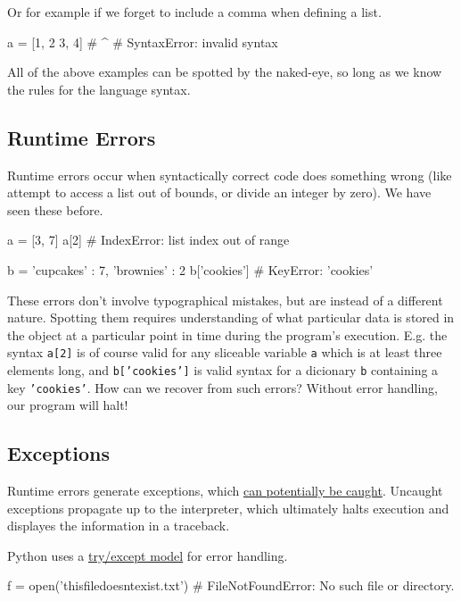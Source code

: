 \documentclass[12pt,letterpaper,twoside]{article}
\begin{document}
\begin{enumerate}
Or for example if we forget to include a comma when defining a list.
\begin{python}
a = [1, 2 3, 4]
#        ^
# SyntaxError: invalid syntax
\end{python}

All of the above examples can be spotted by the naked-eye, so long as we know the rules for the language syntax.

\subsection{Runtime Errors}

Runtime errors occur when syntactically correct code does something
wrong (like attempt to access a list out of bounds, or divide an integer by zero).
We have seen these before.

\begin{python}
a = [3, 7]
a[2]          # IndexError: list index out of range

b = {'cupcakes' : 7, 'brownies' : 2}
b['cookies']  # KeyError: 'cookies'
\end{python}

These errors don't involve typographical mistakes, but are instead of a different nature.
Spotting them requires understanding of what particular data is stored in the object
at a particular point in time during the program's execution. E.g. 
the syntax \texttt{a[2]} is of course valid for any sliceable variable \texttt{a} which is at least three elements long,
and \texttt{b['cookies']} is valid syntax for a dicionary \texttt{b} containing a key \texttt{'cookies'}.
How can we recover from such errors? Without error handling, our program will halt!

\subsection{Exceptions}
Runtime errors generate exceptions, which \href{https://en.wikipedia.org/wiki/Exception_handling}{can potentially be caught}. 
Uncaught exceptions propagate up to the interpreter, which
ultimately halts execution and displayes the information in a traceback.

Python uses a \href{https://docs.python.org/3/tutorial/errors.html#handling-exceptions}{try/except model} 
for error handling.

\begin{python}
f = open('thisfiledoesntexist.txt')   # FileNotFoundError: No such file or directory.
\end{python}


\end{enumerate}
\end{document}
